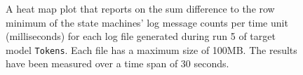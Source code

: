 \begin{figure}[htbp]
\centering
\begin{minipage}{1\textwidth}
  \centering
\end{minipage}
\caption{A heat map plot that reports on the sum difference to the row minimum of the state machines' log message counts per time unit (milliseconds) for each log file generated during run 5 of target model \texttt{Tokens}. Each file has a maximum size of 100MB. The results have been measured over a time span of 30 seconds.}
\label{figure:throughput_difference_tokens_5}
\end{figure}